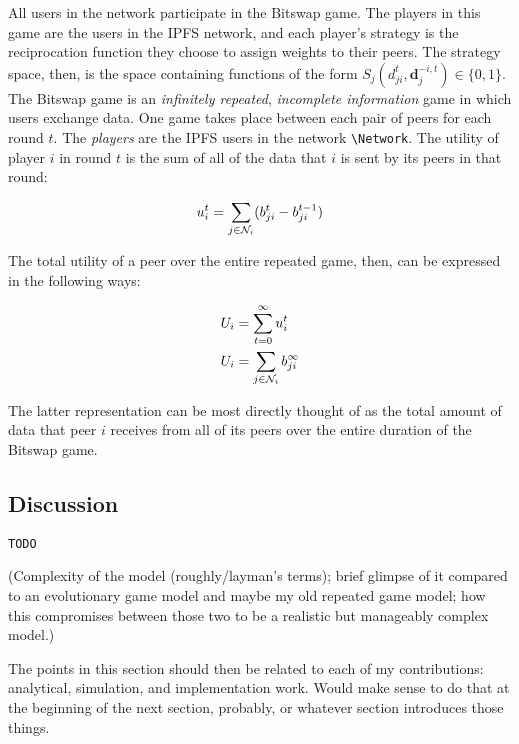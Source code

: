 All users in the network participate in the Bitswap game. The players in
this game are the users in the IPFS network, and each player's strategy
is the reciprocation function they choose to assign weights to their
peers. The strategy space, then, is the space containing
functions of the form
$S_j(d_{ji}^t, \mathbf{d}_j^{-i,t}) \in \{0, 1\}$. The Bitswap game is
an \emph{infinitely repeated}, \emph{incomplete information} game in
which users exchange data. One game takes place between each pair of
peers for each round $t$. The \emph{players} are the IPFS users in the
network \texttt{\textbackslash{}Network}. The utility of player $i$ in
round $t$ is the sum of all of the data that $i$ is sent by its
peers in that round:

\[u_i^t = \sum_{j \in \mathcal{N}_{i}} (b_{ji}^t - b_{ji}^{t-1})\]

The total utility of a peer over the entire repeated game, then, can be
expressed in the following ways:

\begin{align*}
U_i &= \sum_{t=0}^{\infty} u_i^t \\
U_i &= \sum_{j \in \mathcal{N}_{i}} b_{ji}^\infty
\end{align*}

The latter representation can be most directly thought of as the total
amount of data that peer $i$ receives from all of its peers over the
entire duration of the Bitswap game.

\hypertarget{discussion}{%
\subsection{Discussion}\label{discussion}}

\texttt{TODO}

(Complexity of the model (roughly/layman's terms); brief glimpse of it
compared to an evolutionary game model and maybe my old repeated game
model; how this compromises between those two to be a realistic but
manageably complex model.)

The points in this section should then be related to each of my
contributions: analytical, simulation, and implementation work. Would
make sense to do that at the beginning of the next section, probably, or
whatever section introduces those things.
